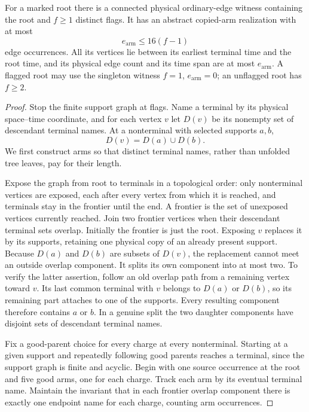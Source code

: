 \begin{lemma}\label{nw:arms}
For a marked root there is a connected physical ordinary-edge witness containing the root and
$f\ge1$ distinct flags. It has an abstract copied-arm realization with at most
\begin{equation}\label{nw:armcount}
  e_{\mathrm{arm}}\le 16(f-1)
\end{equation}
edge occurrences. All its vertices lie between its earliest terminal time and the root time, and its
physical edge count and its time span are at most $e_{\mathrm{arm}}$. A flagged root may use the
singleton witness $f=1$, $e_{\mathrm{arm}}=0$; an unflagged root has $f\ge2$.
\end{lemma}
\begin{proof}
Stop the finite support graph at flags. Name a terminal by its physical space--time coordinate, and for each vertex $v$ let $D(v)$ be its nonempty set of descendant terminal names. At a nonterminal with selected supports $a,b$,
\[
 D(v)=D(a)\cup D(b).
\]
We first construct arms so that distinct terminal names, rather than unfolded tree leaves, pay for their length.

Expose the graph from root to terminals in a topological order: only nonterminal vertices are
exposed, each after every vertex from which it is reached, and terminals stay in the frontier until
the end. A frontier is the set of unexposed vertices currently reached. Join two frontier vertices when their descendant terminal sets overlap. Initially the frontier is just the root. Exposing $v$ replaces it by its supports, retaining one physical copy of an already present support. Because $D(a)$ and $D(b)$ are subsets of $D(v)$, the replacement cannot meet an outside overlap component. It splits its own component into at most two. To verify the latter assertion, follow an old overlap path from a remaining vertex toward $v$. Its last common terminal with $v$ belongs to $D(a)$ or $D(b)$, so its remaining part attaches to one of the supports. Every resulting component therefore contains $a$ or $b$. In a genuine split the two daughter components have disjoint sets of descendant terminal names.

Fix a good-parent choice for every charge at every nonterminal. Starting at a given support and repeatedly following good parents reaches a terminal, since the support graph is finite and acyclic. Begin with one source occurrence at the root and five good arms, one for each charge. Track each arm by its eventual terminal name. Maintain the invariant that in each frontier overlap component there is exactly one endpoint name for each charge, counting arm occurrences.


\end{proof}
